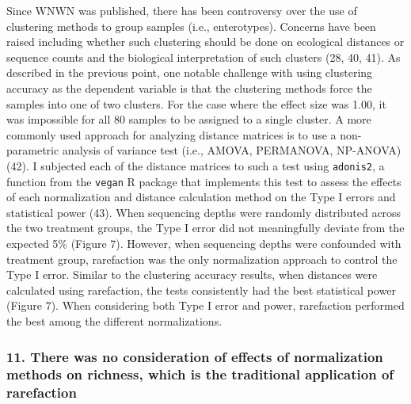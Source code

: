 \documentclass[
]{article}
\begin{document}
Since WNWN was published, there has been controversy over the use of
clustering methods to group samples (i.e., enterotypes). Concerns have
been raised including whether such clustering should be done on
ecological distances or sequence counts and the biological
interpretation of such clusters (28, 40, 41). As described in the
previous point, one notable challenge with using clustering accuracy as
the dependent variable is that the clustering methods force the samples
into one of two clusters. For the case where the effect size was 1.00,
it was impossible for all 80 samples to be assigned to a single cluster.
A more commonly used approach for analyzing distance matrices is to use
a non-parametric analysis of variance test (i.e., AMOVA, PERMANOVA,
NP-ANOVA)(42). I subjected each of the distance matrices to such a test
using \texttt{adonis2}, a function from the \texttt{vegan} R package
that implements this test to assess the effects of each normalization
and distance calculation method on the Type I errors and statistical
power (43). When sequencing depths were randomly distributed across the
two treatment groups, the Type I error did not meaningfully deviate from
the expected 5\% (Figure 7). However, when sequencing depths were
confounded with treatment group, rarefaction was the only normalization
approach to control the Type I error. Similar to the clustering accuracy
results, when distances were calculated using rarefaction, the tests
consistently had the best statistical power (Figure 7). When considering
both Type I error and power, rarefaction performed the best among the
different normalizations.

\hypertarget{there-was-no-consideration-of-effects-of-normalization-methods-on-richness-which-is-the-traditional-application-of-rarefaction}{%
\subsubsection{11. There was no consideration of effects of
normalization methods on richness, which is the traditional application
of
rarefaction}\label{there-was-no-consideration-of-effects-of-normalization-methods-on-richness-which-is-the-traditional-application-of-rarefaction}}
\end{document}
